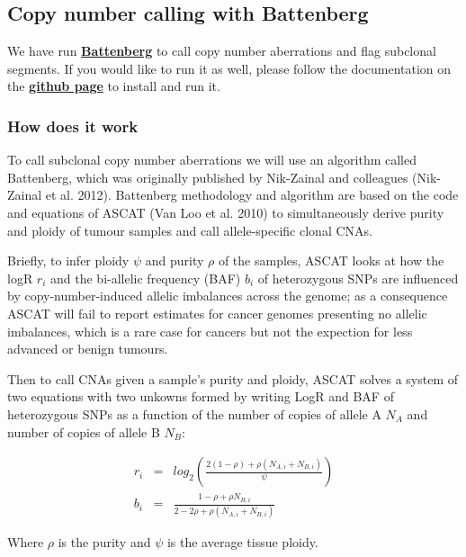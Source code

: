 \documentclass[]{article}
\begin{document}
\newpage

\hypertarget{copy-number-calling-with-battenberg}{%
\subsection{Copy number calling with
Battenberg}\label{copy-number-calling-with-battenberg}}

We have run
\href{https://github.com/Wedge-Oxford/battenberg}{\textbf{Battenberg}}
to call copy number aberrations and flag subclonal segments. If you
would like to run it as well, please follow the documentation on the
\href{https://github.com/Wedge-Oxford/battenberg}{\textbf{github page}}
to install and run it.

\hypertarget{how-does-it-work}{%
\subsubsection{How does it work}\label{how-does-it-work}}

To call subclonal copy number aberrations we will use an algorithm
called Battenberg, which was originally published by Nik-Zainal and
colleagues (Nik-Zainal et al. 2012). Battenberg methodology and
algorithm are based on the code and equations of ASCAT (Van Loo et al.
2010) to simultaneously derive purity and ploidy of tumour samples and
call allele-specific clonal CNAs.

Briefly, to infer ploidy \(\psi\) and purity \(\rho\) of the samples,
ASCAT looks at how the logR \(r_i\) and the bi-allelic frequency (BAF)
\(b_i\) of heterozygous SNPs are influenced by copy-number-induced
allelic imbalances across the genome; as a consequence ASCAT will fail
to report estimates for cancer genomes presenting no allelic imbalances,
which is a rare case for cancers but not the expection for less advanced
or benign tumours.

Then to call CNAs given a sample's purity and ploidy, ASCAT solves a
system of two equations with two unkowns formed by writing LogR and BAF
of heterozygous SNPs as a function of the number of copies of allele A
\(N_A\) and number of copies of allele B \(N_B\):

\[\begin{array}{lcl} r_i&=&
  log_2(\frac{2(1-\rho)+\rho(N_{A,i}+N_{B,i})}{\psi})\\ b_i&=&\frac{1-\rho+\rho N_{B,i}}{2-2\rho+\rho(N_{A,i}+N_{B,i})}
\end{array}\]

Where \(\rho\) is the purity and \(\psi\) is the average tissue ploidy.
\end{document}
